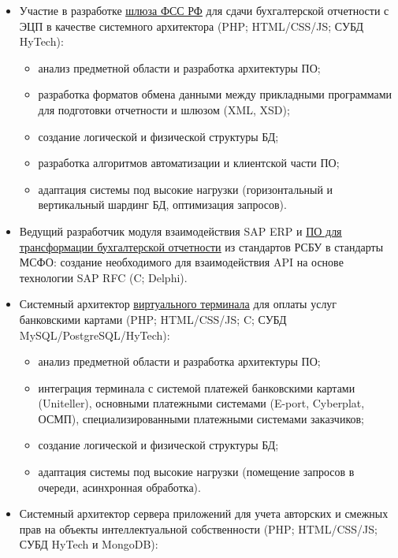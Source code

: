 {\begin{itemize}
\begin{itemize}
  \item адаптация системы под высокие нагрузки (горизонтальный и вертикальный шардинг БД, оптимизация запросов).
  \end{itemize}
\item Участие в разработке \href{http://f4.fss.ru}{\underline{шлюза ФСС РФ}} для сдачи бухгалтерской отчетности с ЭЦП в качестве системного архитектора (PHP; HTML/CSS/JS; СУБД HyTech):
  \begin{itemize}
  \item анализ предметной области и разработка архитектуры ПО;
  \item разработка форматов обмена данными между прикладными программами для подготовки отчетности и шлюзом (XML, XSD);
  \item создание логической и физической структуры БД;
  \item разработка алгоритмов автоматизации и клиентской части ПО;
  \item адаптация системы под высокие нагрузки (горизонтальный и вертикальный шардинг БД, оптимизация запросов).
  \end{itemize}
\item Ведущий разработчик модуля взаимодействия SAP ERP и \href{http://www.openinfotech.ru/index.php?service=4&subs=11}{\underline{ПО для трансформации бухгалтерской отчетности}} из стандартов РСБУ в стандарты МСФО: создание необходимого для взаимодействия API на основе технологии SAP RFC (C; Delphi).	
\item Системный архитектор \href{http://www.openinfotech.ru/index.php?service=4&subs=10}{\underline{виртуального терминала}} для оплаты услуг банковскими картами (PHP; HTML/CSS/JS; C; СУБД MySQL/PostgreSQL/HyTech):
  \begin{itemize}
  \item анализ предметной области и разработка архитектуры ПО;
  \item интеграция терминала с системой платежей банковскими картами (Uniteller), основными платежными системами (E-port, Cyberplat, ОСМП), специализированными платежными системами заказчиков;
  \item создание логической и физической структуры БД;
  \item адаптация системы под высокие нагрузки (помещение запросов в очереди, асинхронная обработка).
  \end{itemize}
\item Системный архитектор сервера приложений для учета авторских и смежных прав на объекты интеллектуальной собственности (PHP; HTML/CSS/JS; СУБД HyTech и MongoDB):

\end{itemize}}

